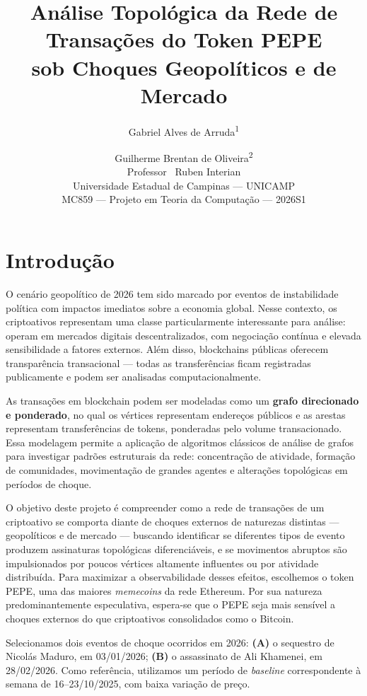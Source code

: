\documentclass[12pt,a4paper]{article}
\title{Análise Topológica da Rede de Transações do Token PEPE \\ sob Choques Geopolíticos e de Mercado}
\author{
  Gabriel Alves de Arruda\textsuperscript{1} \and
  Guilherme Brentan de Oliveira\textsuperscript{2} \\[6pt]
  \small Professor \ Ruben Interian \\
  \small Universidade Estadual de Campinas --- UNICAMP \\
  \small MC859 --- Projeto em Teoria da Computação --- 2026S1
}
\date{}
\begin{document}
\maketitle

\section{Introdução}

O cenário geopolítico de 2026 tem sido marcado por eventos de instabilidade política com impactos imediatos sobre a economia global. Nesse contexto, os criptoativos representam uma classe particularmente interessante para análise: operam em mercados digitais descentralizados, com negociação contínua e elevada sensibilidade a fatores externos. Além disso, blockchains públicas oferecem transparência transacional --- todas as transferências ficam registradas publicamente e podem ser analisadas computacionalmente.

As transações em blockchain podem ser modeladas como um \textbf{grafo direcionado e ponderado}, no qual os vértices representam endereços públicos e as arestas representam transferências de tokens, ponderadas pelo volume transacionado. Essa modelagem permite a aplicação de algoritmos clássicos de análise de grafos para investigar padrões estruturais da rede: concentração de atividade, formação de comunidades, movimentação de grandes agentes e alterações topológicas em períodos de choque.

O objetivo deste projeto é compreender como a rede de transações de um criptoativo se comporta diante de choques externos de naturezas distintas --- geopolíticos e de mercado --- buscando identificar se diferentes tipos de evento produzem assinaturas topológicas diferenciáveis, e se movimentos abruptos são impulsionados por poucos vértices altamente influentes ou por atividade distribuída. Para maximizar a observabilidade desses efeitos, escolhemos o token PEPE, uma das maiores \textit{memecoins} da rede Ethereum. Por sua natureza predominantemente especulativa, espera-se que o PEPE seja mais sensível a choques externos do que criptoativos consolidados como o Bitcoin.

Selecionamos dois eventos de choque ocorridos em 2026: \textbf{(A)} o sequestro de Nicolás Maduro, em 03/01/2026; \textbf{(B)} o assassinato de Ali Khamenei, em 28/02/2026. Como referência, utilizamos um período de \textit{baseline} correspondente à semana de 16--23/10/2025, com baixa variação de preço.
\end{document}
